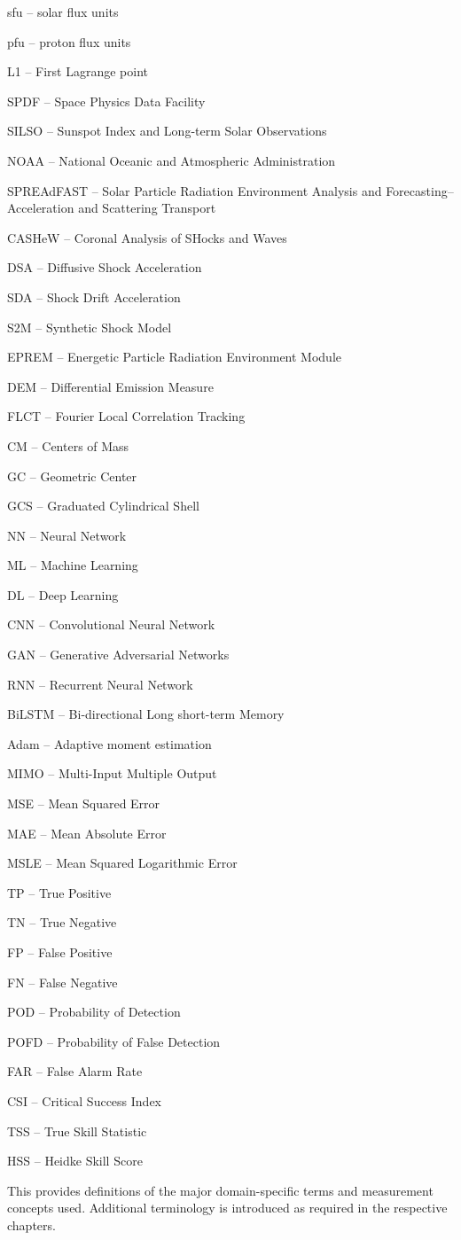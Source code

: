 sfu -- solar flux units

pfu -- proton flux units

L1 -- First Lagrange point

SPDF -- Space Physics Data Facility

SILSO -- Sunspot Index and Long-term Solar Observations

NOAA -- National Oceanic and Atmospheric Administration

SPREAdFAST -- Solar Particle Radiation Environment Analysis and Forecasting–Acceleration and Scattering Transport

CASHeW -- Coronal Analysis of SHocks and Waves

DSA -- Diffusive Shock Acceleration

SDA -- Shock Drift Acceleration

S2M -- Synthetic Shock Model

EPREM -- Energetic Particle Radiation Environment Module

DEM -- Differential Emission Measure

FLCT -- Fourier Local Correlation Tracking

CM -- Centers of Mass

GC -- Geometric Center

GCS -- Graduated Cylindrical Shell

NN -- Neural Network

ML -- Machine Learning

DL -- Deep Learning

CNN -- Convolutional Neural Network

GAN -- Generative Adversarial Networks

RNN -- Recurrent Neural Network

BiLSTM -- Bi-directional Long short-term Memory

Adam -- Adaptive moment estimation

MIMO -- Multi-Input Multiple Output

MSE -- Mean Squared Error

MAE -- Mean Absolute Error

MSLE -- Mean Squared Logarithmic Error

TP -- True Positive

TN -- True Negative

FP -- False Positive

FN -- False Negative

POD -- Probability of Detection

POFD -- Probability of False Detection

FAR -- False Alarm Rate

CSI -- Critical Success Index

TSS -- True Skill Statistic

HSS -- Heidke Skill Score

This provides definitions of the major domain-specific terms and measurement concepts used. Additional terminology is introduced as required in the respective chapters.
